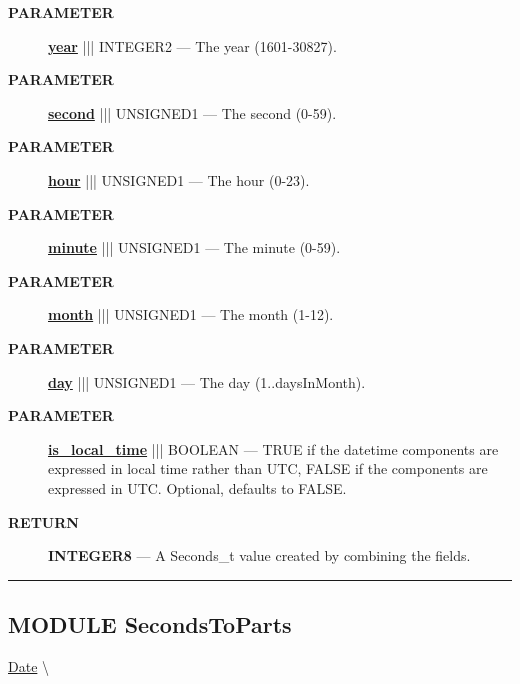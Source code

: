 \par
\begin{description}
\item [\colorbox{tagtype}{\color{white} \textbf{\textsf{PARAMETER}}}] \textbf{\underline{year}} ||| INTEGER2 --- The year (1601-30827).
\item [\colorbox{tagtype}{\color{white} \textbf{\textsf{PARAMETER}}}] \textbf{\underline{second}} ||| UNSIGNED1 --- The second (0-59).
\item [\colorbox{tagtype}{\color{white} \textbf{\textsf{PARAMETER}}}] \textbf{\underline{hour}} ||| UNSIGNED1 --- The hour (0-23).
\item [\colorbox{tagtype}{\color{white} \textbf{\textsf{PARAMETER}}}] \textbf{\underline{minute}} ||| UNSIGNED1 --- The minute (0-59).
\item [\colorbox{tagtype}{\color{white} \textbf{\textsf{PARAMETER}}}] \textbf{\underline{month}} ||| UNSIGNED1 --- The month (1-12).
\item [\colorbox{tagtype}{\color{white} \textbf{\textsf{PARAMETER}}}] \textbf{\underline{day}} ||| UNSIGNED1 --- The day (1..daysInMonth).
\item [\colorbox{tagtype}{\color{white} \textbf{\textsf{PARAMETER}}}] \textbf{\underline{is\_local\_time}} ||| BOOLEAN --- TRUE if the datetime components are expressed in local time rather than UTC, FALSE if the components are expressed in UTC. Optional, defaults to FALSE.
\end{description}







\par
\begin{description}
\item [\colorbox{tagtype}{\color{white} \textbf{\textsf{RETURN}}}] \textbf{INTEGER8} --- A Seconds\_t value created by combining the fields.
\end{description}




\rule{\linewidth}{0.5pt}
\subsection*{\textsf{\colorbox{headtoc}{\color{white} MODULE}
SecondsToParts}}

\hypertarget{ecldoc:date.secondstoparts}{}
\hspace{0pt} \hyperlink{ecldoc:Date}{Date} \textbackslash 

